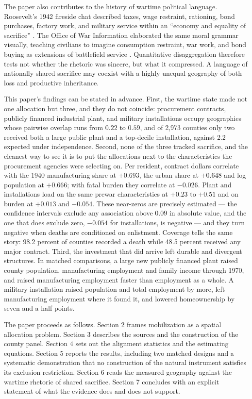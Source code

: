 \documentclass[12pt]{article}
\newcommand{\parencite}[1]{\citep{#1}}
\begin{document}
The paper also contributes to the history of wartime political language. Roosevelt's 1942 fireside chat described taxes, wage restraint, rationing, bond purchases, factory work, and military service within an ``economy and equality of sacrifice'' \parencite{roosevelt1942}. The Office of War Information elaborated the same moral grammar visually, teaching civilians to imagine consumption restraint, war work, and bond buying as extensions of battlefield service \parencite{winkler1978,sparrow2011}. Quantitative disaggregation therefore tests not whether the rhetoric was sincere, but what it compressed. A language of nationally shared sacrifice may coexist with a highly unequal geography of both loss and productive inheritance.

This paper's findings can be stated in advance. First, the wartime state made
not one allocation but three, and they do not coincide: procurement contracts,
publicly financed industrial plant, and military installations occupy
geographies whose pairwise overlap runs from $0.22$ to $0.59$, and of 2{,}973
counties only two received both a large public plant and a top-decile
installation, against 2.2 expected under independence. Second, none of the three
tracked sacrifice, and the cleanest way to see it is to put the allocations next
to the characteristics the procurement agencies were selecting on. Per resident,
contract dollars correlate with the 1940 manufacturing share at $+0.693$, the
urban share at $+0.648$ and log population at $+0.666$; with fatal burden they
correlate at $-0.026$. Plant and installations load on the same prewar
characteristics at $+0.23$ to $+0.51$ and on burden at $+0.013$ and $-0.054$.
These near-zeros are precisely estimated --- the confidence intervals exclude
any association above $0.09$ in absolute value, and the one that does exclude
zero, $-0.054$ for installations, is negative --- and they turn negative when deaths are conditioned
on enlistment. Coverage tells the same story: 98.2 percent of counties recorded
a death while 48.5 percent received any major contract. Third, the investment that
did arrive left durable and divergent structures. In matched comparisons, a large
new publicly financed plant raised county population, manufacturing employment
and family income through 1970, and raised manufacturing employment faster than
employment as a whole. A military installation raised population and total
employment by more, left manufacturing employment where it found it, and lowered
homeownership by seven and a half points.

The paper proceeds as follows. Section 2 frames mobilization as a spatial
allocation problem. Section 3 describes the sources and the construction of the
county panel. Section 4 sets out the alignment statistics and the estimating
equations. Section 5 reports the results, including two matched designs and a systematic
demonstration that no construction of the natural instrument satisfies its
exclusion restriction. Section 6 reads the measured
geography against the wartime rhetoric of shared sacrifice. Section 7 concludes
with an explicit statement of what the evidence does and does not support.
\end{document}
